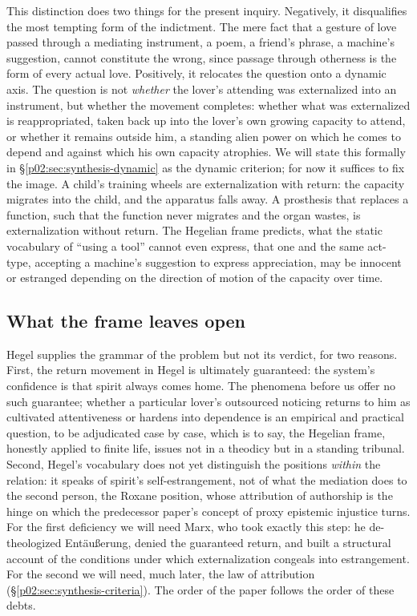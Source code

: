 \documentclass[11pt,a4paper]{article}
\begin{document}
This distinction does two things for the present inquiry. Negatively, it disqualifies the most tempting form of the indictment. The mere fact that a gesture of love passed through a mediating instrument, a poem, a friend's phrase, a machine's suggestion, cannot constitute the wrong, since passage through otherness is the form of every actual love. Positively, it relocates the question onto a dynamic axis. The question is not \emph{whether} the lover's attending was externalized into an instrument, but whether the movement completes: whether what was externalized is reappropriated, taken back up into the lover's own growing capacity to attend, or whether it remains outside him, a standing alien power on which he comes to depend and against which his own capacity atrophies. We will state this formally in \S\ref{p02:sec:synthesis-dynamic} as the dynamic criterion; for now it suffices to fix the image. A child's training wheels are externalization with return: the capacity migrates into the child, and the apparatus falls away. A prosthesis that replaces a function, such that the function never migrates and the organ wastes, is externalization without return. The Hegelian frame predicts, what the static vocabulary of ``using a tool'' cannot even express, that one and the same act-type, accepting a machine's suggestion to express appreciation, may be innocent or estranged depending on the direction of motion of the capacity over time.

\subsection{What the frame leaves open}
\label{p02:sec:hegel-open}

Hegel supplies the grammar of the problem but not its verdict, for two reasons. First, the return movement in Hegel is ultimately guaranteed: the system's confidence is that spirit always comes home. The phenomena before us offer no such guarantee; whether a particular lover's outsourced noticing returns to him as cultivated attentiveness or hardens into dependence is an empirical and practical question, to be adjudicated case by case, which is to say, the Hegelian frame, honestly applied to finite life, issues not in a theodicy but in a standing tribunal. Second, Hegel's vocabulary does not yet distinguish the positions \emph{within} the relation: it speaks of spirit's self-estrangement, not of what the mediation does to the second person, the Roxane position, whose attribution of authorship is the hinge on which the predecessor paper's concept of proxy epistemic injustice turns. For the first deficiency we will need Marx, who took exactly this step: he de-theologized Ent\"au{\ss}erung, denied the guaranteed return, and built a structural account of the conditions under which externalization congeals into estrangement. For the second we will need, much later, the law of attribution (\S\ref{p02:sec:synthesis-criteria}). The order of the paper follows the order of these debts.
\end{document}
